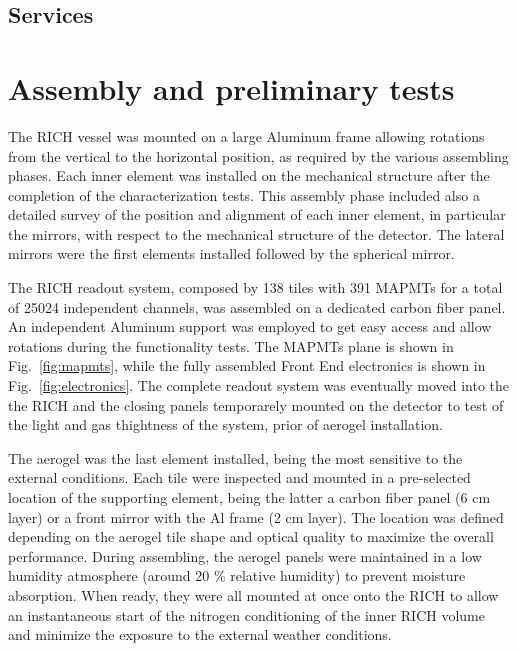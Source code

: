 \documentclass[final,5p,times,twocolumn]{elsarticle}
\begin{document}
\subsection{Services}


\section{Assembly and preliminary tests}

The RICH vessel was mounted on a large Aluminum frame allowing rotations from the vertical to the horizontal position,
as required by the various assembling phases.
Each inner element was installed on the mechanical structure after the completion of the characterization
tests. This assembly phase included also a detailed survey of the position and alignment
of each inner element, in particular the mirrors, with respect to the mechanical structure of the detector.
The lateral mirrors were the first elements installed followed by the spherical mirror.


The RICH readout system, composed by 138 tiles with 391 MAPMTs for a total of 25024 independent channels, was assembled on a 
dedicated carbon fiber panel. An independent Aluminum support was employed to get easy access and allow rotations during the 
functionality tests. 
The MAPMTs plane is shown in Fig.~\ref{fig:mapmts},
while the fully assembled Front End electronics is shown in Fig.~\ref{fig:electronics}.
The complete readout system was eventually moved into the the RICH and the closing panels temporarely mounted 
on the detector to test of the light and gas thightness of the system, prior of aerogel installation.

The aerogel was the last element installed, being the most sensitive to the external conditions. Each tile
were inspected and mounted in a pre-selected location of the supporting element, being the latter a carbon fiber panel 
(6 cm layer) or a front mirror with the Al frame (2 cm layer). The location was defined depending on the
aerogel tile shape and optical quality to maximize the overall performance. During assembling, the aerogel panels were 
maintained in a low humidity atmosphere (around 20 \%
relative humidity) to prevent moisture absorption. When ready, they were all mounted at once onto the RICH to allow an
instantaneous start of the nitrogen conditioning of the inner RICH volume and minimize the exposure to 
the external weather conditions.
\end{document}
